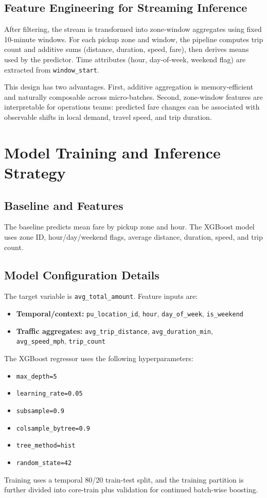 \documentclass[conference]{IEEEtran}
\begin{document}
\subsection{Feature Engineering for Streaming Inference}
After filtering, the stream is transformed into zone-window aggregates using fixed 10-minute windows. For each pickup zone and window, the pipeline computes trip count and additive sums (distance, duration, speed, fare), then derives means used by the predictor. Time attributes (hour, day-of-week, weekend flag) are extracted from \texttt{window\_start}.

This design has two advantages. First, additive aggregation is memory-efficient and naturally composable across micro-batches. Second, zone-window features are interpretable for operations teams: predicted fare changes can be associated with observable shifts in local demand, travel speed, and trip duration.

\section{Model Training and Inference Strategy}
\subsection{Baseline and Features}
The baseline predicts mean fare by pickup zone and hour. The XGBoost model uses zone ID, hour/day/weekend flags, average distance, duration, speed, and trip count.

\subsection{Model Configuration Details}
The target variable is \texttt{avg\_total\_amount}. Feature inputs are:
{\raggedright%
\begin{itemize}[leftmargin=1.5em]
    \item \textbf{Temporal/context:} \texttt{pu\_location\_id}, \texttt{hour}, \texttt{day\_of\_week}, \texttt{is\_weekend}
    \item \textbf{Traffic aggregates:} \texttt{avg\_trip\_distance}, \texttt{avg\_duration\_min}, \texttt{avg\_speed\_mph}, \texttt{trip\_count}
\end{itemize}
\par}

The XGBoost regressor uses the following hyperparameters:
\begin{itemize}[leftmargin=1.5em]
    \item \texttt{max\_depth=5}
    \item \texttt{learning\_rate=0.05}
    \item \texttt{subsample=0.9}
    \item \texttt{colsample\_bytree=0.9}
    \item \texttt{tree\_method=hist}
    \item \texttt{random\_state=42}
\end{itemize}
Training uses a temporal 80/20 train-test split, and the training partition is further divided into core-train plus validation for continued batch-wise boosting.
\end{document}
